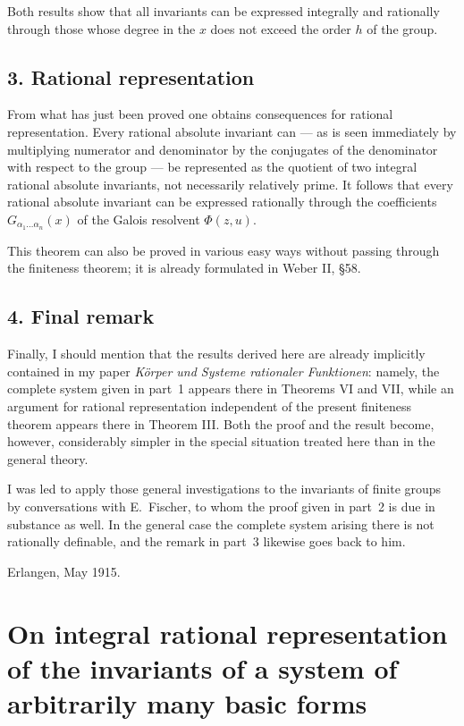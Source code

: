 \documentclass[11pt]{article}
\begin{document}
Both results show that all invariants can be expressed integrally and rationally through those whose degree in the $x$ does not exceed the order $h$ of the group.

\subsection*{3. Rational representation}

From what has just been proved one obtains consequences for rational representation. Every rational absolute invariant can --- as is seen immediately by multiplying numerator and denominator by the conjugates of the denominator with respect to the group --- be represented as the quotient of two integral rational absolute invariants, not necessarily relatively prime. It follows that every rational absolute invariant can be expressed rationally through the coefficients $G_{\alpha_1\dots\alpha_n}(x)$ of the Galois resolvent $\Phi(z,u)$.

This theorem can also be proved in various easy ways without passing through the finiteness theorem; it is already formulated in Weber II, \S 58.

\subsection*{4. Final remark}

Finally, I should mention that the results derived here are already implicitly contained in my paper \emph{Körper und Systeme rationaler Funktionen}: namely, the complete system given in part~1 appears there in Theorems VI and VII, while an argument for rational representation independent of the present finiteness theorem appears there in Theorem III. Both the proof and the result become, however, considerably simpler in the special situation treated here than in the general theory.

I was led to apply those general investigations to the invariants of finite groups by conversations with E.~Fischer, to whom the proof given in part~2 is due in substance as well. In the general case the complete system arising there is not rationally definable, and the remark in part~3 likewise goes back to him.

\begin{flushright}
Erlangen, May 1915.
\end{flushright}

\clearpage
\section*{On integral rational representation of the invariants of a system of arbitrarily many basic forms}
\end{document}
